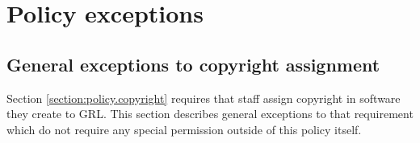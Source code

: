 \documentclass[10pt,a4paper]{article}
\begin{document}
\section{Policy exceptions}
\label{section:exceptions}

\subsection{General exceptions to copyright assignment}
\label{section:exceptions.general}
Section \ref{section:policy.copyright} requires that staff assign copyright in 
software they create to GRL. This section describes general exceptions to 
that requirement which do not require any special permission outside of this 
policy itself. 
\end{document}
